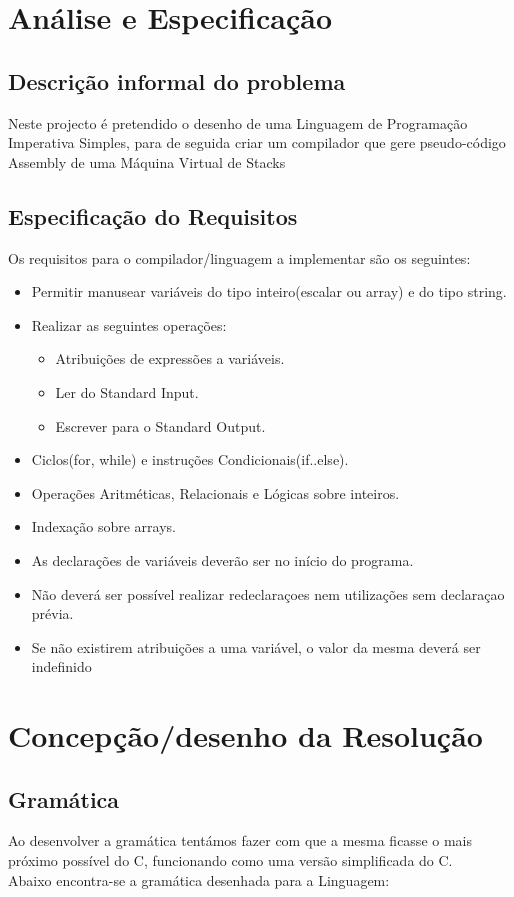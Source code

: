 \documentclass{report}
\begin{document}
\chapter{Análise e Especificação} \label{analiseEsp}

\section{Descrição informal do problema}
Neste projecto é pretendido o desenho de uma Linguagem de Programação Imperativa Simples, para de seguida criar um compilador que gere pseudo-código Assembly de uma Máquina Virtual de Stacks
\section{Especificação do Requisitos}
Os requisitos para o compilador/linguagem a implementar são os seguintes:
\begin{itemize}
  \item Permitir manusear variáveis do tipo inteiro(escalar ou array) e do tipo string.
  \item Realizar as seguintes operações:
	\begin{itemize}
	\item Atribuições de expressões a variáveis.
	\item Ler do Standard Input.
	\item Escrever para o Standard Output.
	\end{itemize}
 \item Ciclos(for, while) e instruções Condicionais(if..else).
 \item Operações Aritméticas, Relacionais e Lógicas sobre inteiros.
 \item Indexação sobre arrays.
 \item As declarações de variáveis deverão ser no início do programa.
 \item Não deverá ser possível realizar redeclaraçoes nem utilizações sem declaraçao prévia.
 \item Se não existirem atribuições a uma variável, o valor da mesma deverá ser indefinido
\end{itemize}

\chapter{Concepção/desenho da Resolução} \label{concepcao}
\section{Gramática}
Ao desenvolver a gramática tentámos fazer com que a mesma ficasse o mais próximo possível do C, funcionando como uma versão simplificada do C.\\Abaixo encontra-se a gramática desenhada para a Linguagem:
\end{document}
